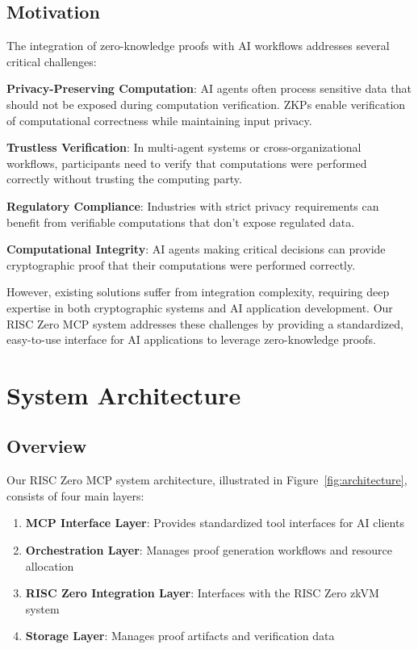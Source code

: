 \documentclass[11pt]{article}
\begin{document}
\subsection{Motivation}

The integration of zero-knowledge proofs with AI workflows addresses several critical challenges:

\textbf{Privacy-Preserving Computation}: AI agents often process sensitive data that should not be exposed during computation verification. ZKPs enable verification of computational correctness while maintaining input privacy.

\textbf{Trustless Verification}: In multi-agent systems or cross-organizational workflows, participants need to verify that computations were performed correctly without trusting the computing party.

\textbf{Regulatory Compliance}: Industries with strict privacy requirements can benefit from verifiable computations that don't expose regulated data.

\textbf{Computational Integrity}: AI agents making critical decisions can provide cryptographic proof that their computations were performed correctly.

However, existing solutions suffer from integration complexity, requiring deep expertise in both cryptographic systems and AI application development. Our RISC Zero MCP system addresses these challenges by providing a standardized, easy-to-use interface for AI applications to leverage zero-knowledge proofs.

\section{System Architecture}
\label{sec:architecture}

\subsection{Overview}

Our RISC Zero MCP system architecture, illustrated in Figure~\ref{fig:architecture}, consists of four main layers:

\begin{enumerate}
\item \textbf{MCP Interface Layer}: Provides standardized tool interfaces for AI clients
\item \textbf{Orchestration Layer}: Manages proof generation workflows and resource allocation  
\item \textbf{RISC Zero Integration Layer}: Interfaces with the RISC Zero zkVM system
\item \textbf{Storage Layer}: Manages proof artifacts and verification data
\end{enumerate}
\end{document}
